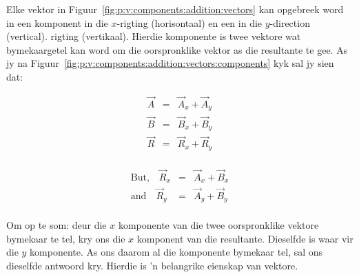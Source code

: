 Elke vektor in Figuur~\ref{fig:p:v:components:addition:vectors} kan opgebreek word in een komponent in die $x$-rigting (horisontaal) en een in die $y$-direction (vertical). rigting (vertikaal). Hierdie komponente is twee vektore wat bymekaargetel kan word om die oorspronklike vektor as die resultante te gee. As jy na Figuur~\ref{fig:p:v:components:addition:vectors:components} kyk sal jy sien dat:

\begin{minipage}{0.5\textwidth}
\begin{eqnarray*}
\vec{A}&=&\vec{A}_x+\vec{A}_y\\
\vec{B}&=&\vec{B}_x+\vec{B}_y\\
\vec{R}&=&\vec{R}_x+\vec{R}_y\\
\end{eqnarray*}
\end{minipage}
\begin{minipage}{0.5\textwidth}
\begin{eqnarray*}
\mbox{But,}\quad \vec{R}_x&=&\vec{A}_x+\vec{B}_x\\
\mbox{and}\quad\vec{R}_y&=&\vec{A}_y+\vec{B}_y\\
\end{eqnarray*}
\end{minipage}

Om op te som: deur die $x$ komponente van die twee oorspronklike vektore bymekaar te tel, kry ons die $x$ komponent van die resultante. Dieselfde is waar vir die $y$ komponente. As ons daarom al die komponente bymekaar tel, sal ons dieselfde antwoord kry. Hierdie is  'n belangrike eienskap van vektore.

